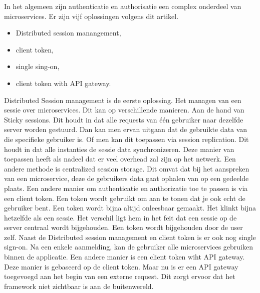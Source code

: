 In het algemeen zijn authenticatie en authorisatie een complex onderdeel van microservices.
Er zijn vijf oplossingen volgens dit artikel.
\begin{itemize}
	\item Distributed session manangement,
	\item client token,
	\item single sing-on, 
	\item client token with API gateway.
\end{itemize}
Distributed Session management is de eerste oplossing. Het managen van een sessie over microservices. Dit kan op verschillende manieren. Aan de hand van Sticky sessions. Dit houdt in dat alle requests van één gebruiker naar dezelfde server worden gestuurd. Dan kan men ervan uitgaan dat de gebruikte data van die specifieke gebruiker is. Of men kan dit toepassen via session replication. Dit houdt in dat alle instanties de sessie data synchronizeren. Deze manier van toepassen heeft als nadeel dat er veel overhead zal zijn op het netwerk. Een andere methode is centralized session storage. Dit omvat dat bij het aanspreken van een microservice, deze de gebruikers data gaat ophalen van op een gedeelde plaats. 
Een andere manier om authenticatie en authorizatie toe te passen is via een client token. Een token wordt gebruikt om aan te tonen dat je ook echt de gebruiker bent. Een token wordt bijna altijd onleesbaar gemaakt. Het klinkt bijna hetzelfde als een sessie. Het verschil ligt hem in het feit dat een sessie op de server centraal wordt bijgehouden. Een token wordt bijgehouden door de user zelf.
Naast de Distributed session management en client token is er ook nog single sign-on. Na een enkele aanmelding, kan de gebruiker alle microservices gebruiken binnen de applicatie. 
Een andere manier is een client token wiht API gateway. Deze manier is gebaseerd op de client token. Maar nu is er een API gateway toegevoegd aan het begin van een externe request. Dit zorgt ervoor dat het framework niet zichtbaar is aan de buitenwereld. 

